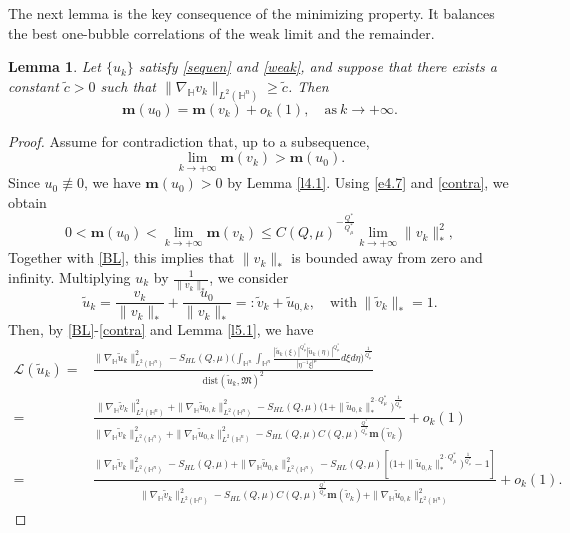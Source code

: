 \documentclass[11pt]{article}
\newtheorem{lemma}{Lemma}[section]
\begin{document}
{The next lemma is the key consequence of the minimizing property. It balances the best one-bubble correlations of the weak limit and the remainder.}
\begin{lemma}\label{l5.2}
Let $\{u_k\}$ satisfy \eqref{sequen} and \eqref{weak}, and suppose that there exists a constant $\tilde{c}>0$ such that $\|\nabla_\mathbb{H} v_k\|_{L^2(\mathbb{H}^n)}\geq \tilde{c}$. Then
\begin{equation*}
 \mathbf{m}(u_0) =\mathbf{m}(v_k)+o_k(1),\quad \mathrm{as} ~k\rightarrow+\infty.
\end{equation*}
\end{lemma}
\begin{proof}
Assume for contradiction that, up to a subsequence,
\begin{equation}\label{contra}
\lim\limits_{k\rightarrow+\infty} \mathbf{m}(v_k)> \mathbf{m}(u_0).
\end{equation}
Since $u_0\not \equiv0$, we have $\mathbf{m}(u_0)>0$ by Lemma \ref{l4.1}.
Using \eqref{e4.7} and \eqref{contra}, we obtain
\begin{equation*}
 0<\mathbf{m}(u_0)< \lim\limits_{k\rightarrow+\infty}\mathbf{m}(v_k)\leq C(Q,\mu)^{-\frac{Q^{\ast}}{Q^{\ast}_{\mu}}}\lim\limits_{k\rightarrow+\infty}\|v_k\|_*^2,
\end{equation*}
Together with \eqref{BL}, this implies that $\|v_k\|_*$ is bounded away from zero and infinity. Multiplying $u_k$ by $\frac{1}{\|v_k\|_*}$, we consider
\begin{equation*}
 \tilde{u}_k=\frac{v_k}{\|v_k\|_*}+\frac{u_0}{\|v_k\|_*}=:\tilde{v}_k+\tilde{u}_{0,k},\quad \mathrm{with}~\|\tilde{v}_k\|_*=1.
\end{equation*}
Then, by \eqref{BL}-\eqref{contra} and Lemma \ref{l5.1}, we have
\begin{align*}
 \mathcal{L}(\tilde{u}_k)=&\frac{\|\nabla_\mathbb{H} \tilde{u}_k\|_{L^2(\mathbb{H}^n)}^2-S_{HL}(Q,\mu) \Big(\int_{\mathbb{H}^{n}}\int_{\mathbb{H}^{n}}\frac{|\tilde{u}_k(\xi)|^{Q^{\ast}_{\mu}}|\tilde{u}_k(\eta)|
^{Q^{\ast}_{\mu}}}{|\eta^{-1}\xi|^{\mu}}{d}\xi{d}\eta\Big)^{\frac{1}{Q^{\ast}_{\mu}}}}{\mathrm{dist}(\tilde{u}_k,\mathfrak{M})^2}\\
=&\frac{\|\nabla_\mathbb{H} \tilde{v}_k\|_{L^2(\mathbb{H}^n)}^2+\|\nabla_\mathbb{H} \tilde{u}_{0,k}\|_{L^2(\mathbb{H}^n)}^2-S_{HL}(Q,\mu) \Big(1+\|\tilde{u}_{0,k}\|_*^{2\cdot Q^{\ast}_{\mu}}\Big)^{\frac{1}{Q^{\ast}_{\mu}}}}
{\|\nabla_\mathbb{H} \tilde{v}_k\|_{L^2(\mathbb{H}^n)}^2+\|\nabla_\mathbb{H} \tilde{u}_{0,k}\|_{L^2(\mathbb{H}^n)}^2-S_{HL}(Q,\mu)C(Q,\mu)^{\frac{Q^{\ast}}{Q^{\ast}_{\mu}}}\mathbf{m}(\tilde{v}_k)}+o_k(1)\\
=&\frac{\|\nabla_\mathbb{H} \tilde{v}_k\|_{L^2(\mathbb{H}^n)}^2-S_{HL}(Q,\mu)+\|\nabla_\mathbb{H} \tilde{u}_{0,k}\|_{L^2(\mathbb{H}^n)}^2-S_{HL}(Q,\mu) \left[\Big(1+\|\tilde{u}_{0,k}\|_*^{2\cdot Q^{\ast}_{\mu}}\Big)^{\frac{1}{Q^{\ast}_{\mu}}}-1\right]}
{\|\nabla_\mathbb{H} \tilde{v}_k\|_{L^2(\mathbb{H}^n)}^2-S_{HL}(Q,\mu)C(Q,\mu)^{\frac{Q^{\ast}}{Q^{\ast}_{\mu}}}\mathbf{m}(\tilde{v}_k)+
\|\nabla_\mathbb{H} \tilde{u}_{0,k}\|_{L^2(\mathbb{H}^n)}^2}+o_k(1).
\end{align*}


\end{proof}
\end{document}
